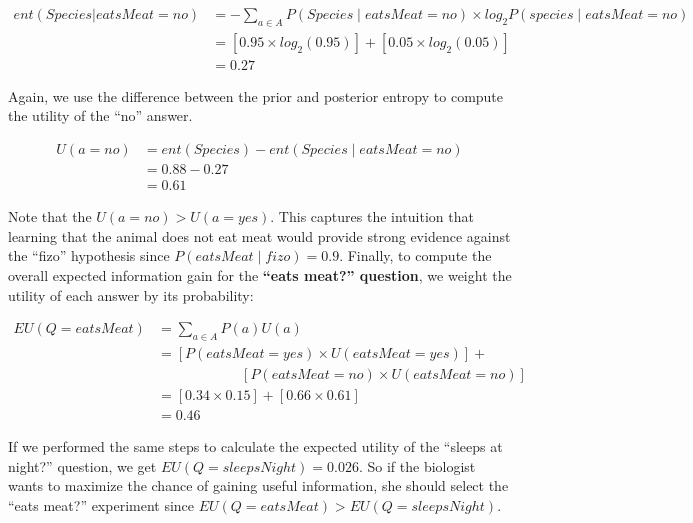 \documentclass[english,floatsintext,man]{apa6}
\theoremstyle{definition}
\theoremstyle{definition}
\theoremstyle{definition}
\theoremstyle{remark}
\begin{document}
\[ 
\begin{aligned}
ent(Species|eatsMeat = no) &= -\sum_{a\in A}{P(Species \mid eatsMeat = no) \times log_2P(species \mid eatsMeat = no)}\\
&= [0.95 \times log_2(0.95)] + [0.05 \times log_2(0.05)]\\
&=  0.27
\end{aligned}
\]

\noindent
Again, we use the difference between the prior and posterior entropy to
compute the utility of the \enquote{no} answer.

\[ 
\begin{aligned}
U(a = no) &= ent(Species) - ent(Species \mid eatsMeat = no)\\
&= 0.88 - 0.27 \\
&= 0.61
\end{aligned}
\]

\noindent
Note that the \(U(a = no) > U(a = yes)\). This captures the intuition
that learning that the animal does not eat meat would provide strong
evidence against the \enquote{fizo} hypothesis since
\(P(eatsMeat \mid fizo) = 0.9\). Finally, to compute the overall
expected information gain for the \textbf{\enquote{eats meat?}
question}, we weight the utility of each answer by its probability:

\[
\begin{aligned}
EU(Q = eatsMeat) &= \sum_{a\in A}{P(a)U(a)} \\
&= [P(eatsMeat = yes) \times U(eatsMeat = yes)] + \\& \qquad \qquad \qquad [P(eatsMeat = no) \times U(eatsMeat = no)]\\
&= [0.34 \times 0.15] + [0.66 \times 0.61]\\
&= 0.46
\end{aligned}
\]

If we performed the same steps to calculate the expected utility of the
\enquote{sleeps at night?} question, we get
\(EU(Q = sleepsNight) = 0.026\). So if the biologist wants to maximize
the chance of gaining useful information, she should select the
\enquote{eats meat?} experiment since
\(EU(Q = eatsMeat) > EU(Q = sleepsNight)\).
\end{document}

